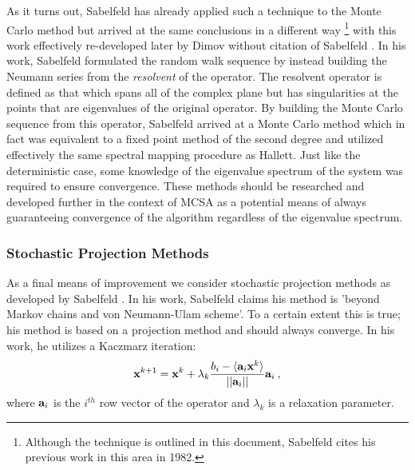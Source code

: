As it turns out, Sabelfeld has already applied such a technique to the
Monte Carlo method but arrived at the same conclusions in a different
way \cite{sabelfeld_sparsified_2009}\footnote{Although the technique
  is outlined in this document, Sabelfeld cites his previous work in
  this area in 1982.} with this work effectively re-developed later by
Dimov without citation of Sabelfeld
\cite{dimov_parallel_2001,dimov_new_1998}. In his work, Sabelfeld
formulated the random walk sequence by instead building the Neumann
series from the \textit{resolvent} of the operator. The resolvent
operator is defined as that which spans all of the complex plane but
has singularities at the points that are eigenvalues of the original
operator. By building the Monte Carlo sequence from this operator,
Sabelfeld arrived at a Monte Carlo method which in fact was equivalent
to a fixed point method of the second degree and utilized effectively
the same spectral mapping procedure as Hallett. Just like the
deterministic case, some knowledge of the eigenvalue spectrum of the
system was required to ensure convergence. These methods should be
researched and developed further in the context of MCSA as a potential
means of always guaranteeing convergence of the algorithm regardless
of the eigenvalue spectrum.

\subsubsection{Stochastic Projection Methods}
\label{subsubsec:stochastic_projection_methods}

As a final means of improvement we consider stochastic projection
methods as developed by Sabelfeld \cite{hutchison_stochastic_2011}. In
his work, Sabelfeld claims his method is 'beyond Markov chains and von
Neumann-Ulam scheme'. To a certain extent this is true; his method is
based on a projection method and should always converge. In his work,
he utilizes a Kaczmarz iteration:
\begin{equation}
  \mathbf{x}^{k+1} = \mathbf{x}^k + \lambda_k \frac{b_i - \langle \mathbf{a}_i
    \mathbf{x}^k \rangle}{||\mathbf{a}_i||}\mathbf{a}_i\:,
  \label{eq:kaczmarz_iteration}
\end{equation}
where $\mathbf{a}_i$ is the $i^{th}$ row vector of the operator and
$\lambda_k$ is a relaxation parameter.

